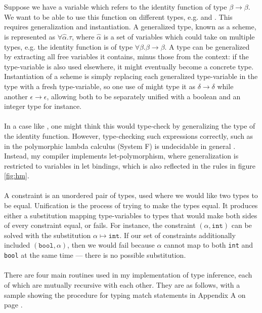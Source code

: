 \\\\
Suppose we have a variable  which refers to the identity function  of type $\beta \rightarrow \beta$. We want to be able to use this function on different types, e.g.  and . This requires generalization and instantiation. A generalized type, known as a scheme, is represented as $\forall \hat{\alpha}. \tau$, where $\hat{\alpha}$ is a set of variables which could take on multiple types, e.g. the identity function is of type $\forall \beta. \beta \rightarrow \beta$. A type can be generalized by extracting all free variables it contains, minus those from the context: if the type-variable is also used elsewhere, it might eventually become a concrete type. Instantiation of a scheme is simply replacing each generalized type-variable in the type with a fresh type-variable, so one use of  might type it as $\delta \rightarrow \delta$ while another $\epsilon \rightarrow \epsilon$, allowing both to be separately unified with a boolean and an integer type for instance.
\\\\
In a case like , one might think this would type-check by generalizing the type of the identity function. However, type-checking such expressions correctly, such as in the polymorphic lambda calculus (System F) is undecidable in general \cite{SystemFUndecidable}. Instead, my compiler implements let-polymorphism, where generalization is restricted to variables in let bindings, which is also reflected in the rules in figure \ref{fig:hm}.
\\\\
A constraint is an unordered pair of types, used where we would like two types to be equal. Unification is the process of trying to make the types equal. It produces either a substitution mapping type-variables to types that would make both sides of every constraint equal, or fails. For instance, the constraint $(\alpha, \texttt{int})$ can be solved with the substitution $\alpha \mapsto \texttt{int}$. If our set of constraints additionally included $(\texttt{bool}, \alpha)$, then we would fail because $\alpha$ cannot map to both \texttt{int} and \texttt{bool} at the same time --- there is no possible substitution.
\\\\
There are four main routines used in my implementation of type inference, each of which are mutually recursive with each other. They are as follows, with a sample showing the procedure for typing match statements in Appendix A on page \pageref{sample:typematch}.
